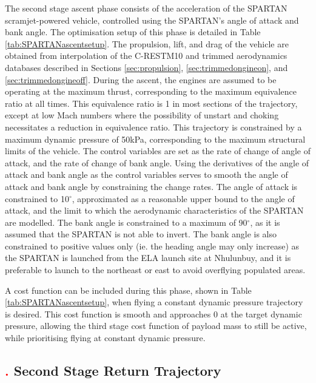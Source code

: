 The second stage ascent phase consists of the acceleration of the SPARTAN scramjet-powered vehicle, controlled using the SPARTAN's angle of attack and bank angle. The optimisation setup of this phase is detailed in Table \ref{tab:SPARTANascentsetup}.
The propulsion, lift, and drag of the vehicle are obtained from interpolation of the C-RESTM10 and trimmed aerodynamics databases described in Sections \ref{sec:propulsion}, \ref{sec:trimmedongineon}, and \ref{sec:trimmedongineoff}. 
During the ascent, the engines are assumed to be operating at the maximum thrust, corresponding to the maximum equivalence ratio at all times. This equivalence ratio is 1 in most sections of the trajectory, except at low Mach numbers where the possibility of unstart and choking necessitates a reduction in equivalence ratio. This trajectory is constrained by a maximum dynamic pressure of 50kPa, corresponding to the maximum structural limits of the vehicle. 
The control variables are set as the rate of change of angle of attack, and the rate of change of bank angle. Using the derivatives of the angle of attack and bank angle as the control variables serves to smooth the angle of attack and bank angle by constraining the change rates. The angle of attack is constrained to 10$^\circ$, approximated as a reasonable upper bound to the angle of attack, and the limit to which the aerodynamic characteristics of the SPARTAN are modelled. The bank angle is constrained to a maximum of 90$^\circ$, as it is assumed that the SPARTAN is not able to invert. The bank angle is also constrained to positive values only (ie. the heading angle may only increase) as the SPARTAN is launched from the ELA launch site at Nhulunbuy, and it is preferable to launch to the northeast or east to avoid overflying populated areas. 

A cost function can be included during this phase, shown in Table \ref{tab:SPARTANascentsetup}, when flying a constant dynamic pressure trajectory is desired. This cost function is smooth and approaches 0 at the target dynamic pressure, allowing the third stage cost function of payload mass to still be active, while prioritising flying at constant dynamic pressure. 


\subsection{\textcolor{red}{.} Second Stage Return Trajectory}

